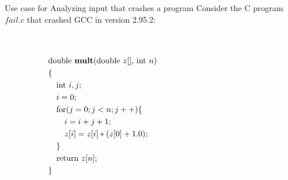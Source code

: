 \begin{frame}{Use case for \ddp\: Analyzing input that crashes a program}
	Consider the C program $fail.c$ that crashed GCC in version 2.95.2:

	\begin{columns}
		\begin{column}{0.475\textwidth}
			\texttt{
			\begin{align*}
	     &\text{double \textbf{mult}(double $z[]$, int $n$)}\\
	     &\{\\
	     	&\quad \text{int } i,j; \\
	     	&\quad i = 0; \\
	     	&\quad \text{for}(j = 0; j < n; j++)\{ \\
	     	&\quad 	\quad i = i + j + 1; \\
	     &	\quad 	\quad z[i] = z[i] * (z[0] + 1.0); \\
	     &	\quad \} \\
	     &	\quad \text{return } z[n]; \\
	    & \}
	\end{align*}
		} 
		\end{column}
		\begin{column}{0.475\textwidth}
			
		\end{column}
		
	\end{columns}

	
	
\end{frame}

